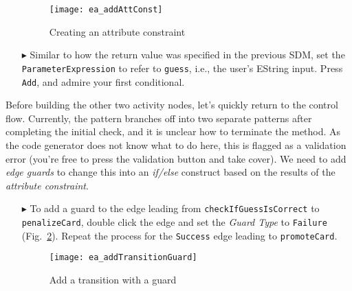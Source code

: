 \begin{itemize}
\vspace{0.5cm}

\begin{figure}[htbp]
\begin{center}
  \texttt{[image: ea\_addAttConst]}
  \caption{Creating an attribute constraint}
  \label{ea:sdmcheck_att_constraint}
\end{center}
\end{figure}

\item[$\blacktriangleright$] Similar to how the return value was specified in the previous SDM, set the \texttt{ParameterExpression} to refer to \texttt{guess},
i.e., the user's EString input. Press \texttt{Add}, and admire your first conditional.

\end{itemize}

Before building the other two activity nodes, let's quickly return to the control flow. Currently, the pattern branches off into two separate patterns after
completing the initial check, and it is unclear how to terminate the method. As the code generator does not know what to do here, this is flagged as a
validation error (you're free to press the validation button and take cover). We
need to add \emph{edge guards} to change this into an \emph{if/else} construct based on the results of the \emph{attribute constraint}.

\newpage
\begin{itemize}

\item[$\blacktriangleright$] To add a guard to the edge leading from \texttt{check\-If\-Guess\-Is\-Correct} to \texttt{penalize\-Card}, double click the edge
and set the \emph{Guard Type} to \texttt{Failure} (Fig.~\ref{ea:sdm_check_guard}).
Repeat the process for the \texttt{Success} edge leading to \texttt{promoteCard}.

\vspace{0.5cm}

\begin{figure}[htbp]
\begin{center}
  \texttt{[image: ea\_addTransitionGuard]}
  \caption{Add a transition with a guard}
  \label{ea:sdm_check_guard}
\end{center}
\end{figure}

\vspace{0.5cm}

\end{itemize}

